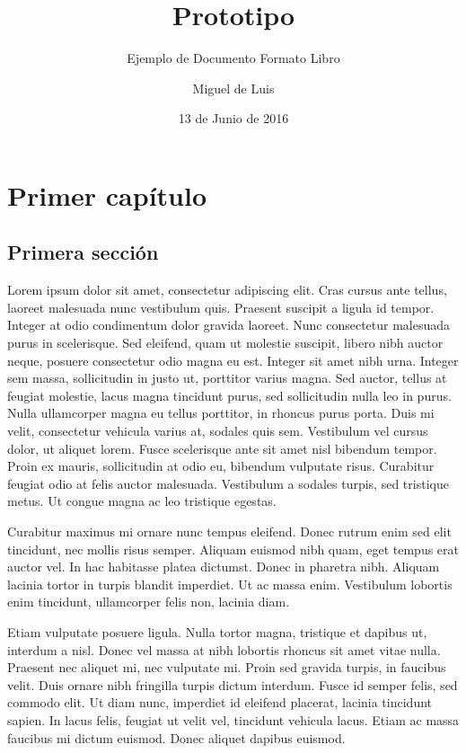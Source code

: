 \documentclass[a4paper,twoside=false,12pt,spanish,DIV=7]{scrbook}
\title{Prototipo}
\subtitle{Ejemplo de Documento Formato Libro}
\author{Miguel de Luis}
\date{13 de Junio de 2016} %
\begin{document}

\frontmatter
\maketitle       %
\listoftodos     %
\tableofcontents %



\mainmatter

\chapter{Primer capítulo}

\section{Primera sección}
Lorem ipsum dolor sit amet, consectetur adipiscing elit. Cras cursus ante tellus, laoreet malesuada nunc vestibulum quis. Praesent suscipit a ligula id tempor. Integer at odio condimentum dolor gravida laoreet. Nunc consectetur malesuada purus in scelerisque. Sed eleifend, quam ut molestie suscipit, libero nibh auctor neque, posuere consectetur odio magna eu est. Integer sit amet nibh urna. Integer sem massa, sollicitudin in justo ut, porttitor varius magna. Sed auctor, tellus at feugiat molestie, lacus magna tincidunt purus, sed sollicitudin nulla leo in purus. Nulla ullamcorper magna eu tellus porttitor, in rhoncus purus porta. Duis mi velit, consectetur vehicula varius at, sodales quis sem. Vestibulum vel cursus dolor, ut aliquet lorem. Fusce scelerisque ante sit amet nisl bibendum tempor. Proin ex mauris, sollicitudin at odio eu, bibendum vulputate risus. Curabitur feugiat odio at felis auctor malesuada. Vestibulum a sodales turpis, sed tristique metus. Ut congue magna ac leo tristique egestas.


Curabitur maximus mi ornare nunc tempus eleifend. Donec rutrum enim sed elit tincidunt, nec mollis risus semper. Aliquam euismod nibh quam, eget tempus erat auctor vel. In hac habitasse platea dictumst. Donec in pharetra nibh. Aliquam lacinia tortor in turpis blandit imperdiet. Ut ac massa enim. Vestibulum lobortis enim tincidunt, ullamcorper felis non, lacinia diam.

Etiam vulputate posuere ligula. Nulla tortor magna, tristique et dapibus ut, interdum a nisl. Donec vel massa at nibh lobortis rhoncus sit amet vitae nulla. Praesent nec aliquet mi, nec vulputate mi. Proin sed gravida turpis, in faucibus velit. Duis ornare nibh fringilla turpis dictum interdum. Fusce id semper felis, sed commodo elit. Ut diam nunc, imperdiet id eleifend placerat, lacinia tincidunt sapien. In lacus felis, feugiat ut velit vel, tincidunt vehicula lacus. Etiam ac massa faucibus mi dictum euismod. Donec aliquet dapibus euismod.
\end{document}
